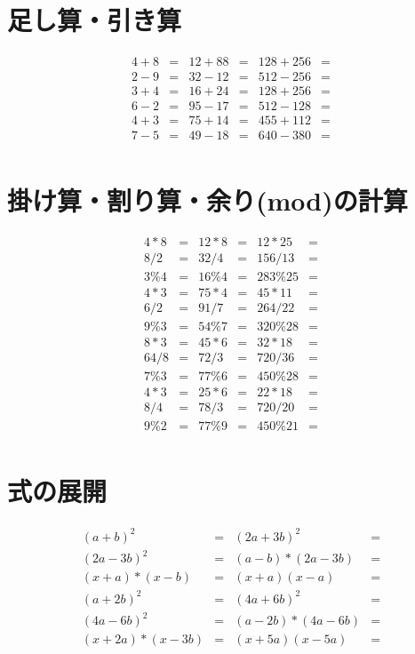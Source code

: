 \documentclass[paper=b4j,landscape,twocolumn,fleqn,10pt]{jlreq}
\begin{document}
\section{足し算・引き算}
\begin{align*}
  4+8&= & 12+88&= & 128+256&=\\
  2-9&= & 32-12&= & 512-256&=\\
  3+4&= & 16+24&= & 128+256&=\\
  6-2&= & 95-17&= & 512-128&=\\
  4+3&= & 75+14&= & 455+112&=\\
  7-5&= & 49-18&= & 640-380&=\\
\end{align*}
\section{掛け算・割り算・余り(mod)の計算}
\begin{align*}
  4*8&= & 12*8&= & 12*25&=\\
  8/2&= & 32/4&= & 156/13&=\\
  3\%4&= & 16\%4&= & 283\%25&=\\
  4*3&= & 75*4&= & 45*11&=\\
  6/2&= & 91/7&= & 264/22&=\\
  9\%3&= & 54\%7&= & 320\%28&=\\
  8*3&= & 45*6&= & 32*18&=\\
  64/8&= & 72/3&= & 720/36&=\\
  7\%3&= & 77\%6&= & 450\%28&=\\
  4*3&= & 25*6&= & 22*18&=\\
  8/4&= & 78/3&= & 720/20&=\\
  9\%2&= & 77\%9&= & 450\%21&=\\
\end{align*}
\section{式の展開}
\begin{align*}
  (a+b)^2 &=& (2a+3b)^2 &=\\
  (2a-3b)^2 &=& (a-b)*(2a-3b) &=\\
  (x+a)*(x-b) &= & (x+a)(x-a)&=\\
  (a+2b)^2 &=& (4a+6b)^2 &=\\
  (4a-6b)^2 &=& (a-2b)*(4a-6b) &=\\
  (x+2a)*(x-3b) &= & (x+5a)(x-5a)&=\\
\end{align*}
\end{document}

